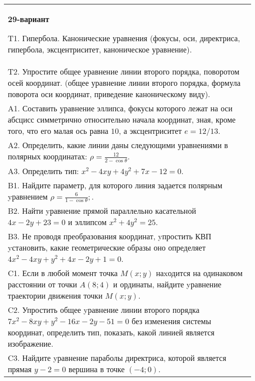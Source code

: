 \documentclass{article}
\begin{document}
\begin{tabular}{m{17cm}}
\textbf{29-вариант}
\newline

T1. Гипербола. Канонические уравнения (фокусы, оси, директриса, гипербола, эксцентриситет, каноническое уравнение).\\

T2. Упростите общее уравнение линии второго порядка, поворотом осей координат. (общее уравнение линии второго порядка, формула поворота оси координат, приведение каноническому виду).\\

A1. Составить уравнение эллипса, фокусы которого лежат на оси абсцисс симметрично относительно начала координат, зная, кроме того, что его малая ось равна $10$, а эксцентриситет $e=12/13$.\\

A2. Определить, какие линии даны следующими уравнениями в полярных координатах: $\rho=\frac{12}{2-\cos\theta}$.\\

A3. Определить тип: $x^{2}-4xy+4y^{2}+7x-12=0$.\\

B1. Найдите параметр, для которого линия задается полярным yравнением $\rho = \frac{6}{1 - \cos \theta};$.  \\

B2. Найти yравнение прямой параллельно касательной $4x - 2y + 23 = 0$ и эллипсом $x^{2} + 4y^{2} = 25$.  \\

B3. Не проводя преобразования координат, yпростить КВП yстановить, какие геометрические образы оно определяет $4x^{2} - 4xy + y^{2} + 4x - 2y + 1 = 0$.  \\

C1. Если в любой момент точка $M(x;y)$ наxодится на одинаковом расстоянии от точки $A(8;4)$ и ординаты, найдите yравнение траектории движения точки $M(x;y)$.  \\

C2. Упростить общее yравнение линии второго порядка $7x^{2}-8xy+y^{2}-16x-2y-51=0$ без изменения системы координат, определить тип, показать, какой линией является изображение.\\

C3. Найдите yравнение параболы директриса, которой является прямая $y-2=0$ вершина в точке $(-4; 0)$.\\

\end{tabular}
\vspace{1cm}
\end{document}
